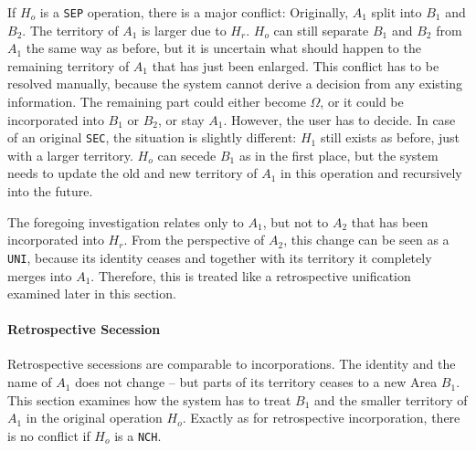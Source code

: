 If $H_o$ is a \texttt{SEP} operation, there is a major conflict: Originally, $A_1$ split into $B_1$ and $B_2$. The territory of $A_1$ is larger due to $H_r$. $H_o$ can still separate $B_1$ and $B_2$ from $A_1$ the same way as before, but it is uncertain what should happen to the remaining territory of $A_1$ that has just been enlarged. This conflict has to be resolved manually, because the system cannot derive a decision from any existing information. The remaining part could either become $\Omega$, or it could be incorporated into $B_1$ or $B_2$, or stay $A_1$. However, the user has to decide. In case of an original \texttt{SEC}, the situation is slightly different: $H_1$ still exists as before, just with a larger territory. $H_o$ can secede $B_1$ as in the first place, but the system needs to update the old and new territory of $A_1$ in this operation and recursively into the future.

The foregoing investigation relates only to $A_1$, but not to $A_2$ that has been incorporated into $H_r$. From the perspective of $A_2$, this change can be seen as a \texttt{UNI}, because its identity ceases and together with its territory it completely merges into $A_1$. Therefore, this is treated like a retrospective unification examined later in this section.


\paragraph{Retrospective Secession} %
\label{par:retrospective_secession}

Retrospective secessions are comparable to incorporations. The identity and the name of $A_1$ does not change -- but parts of its territory ceases to a new Area $B_1$. This section examines how the system has to treat $B_1$ and the smaller territory of $A_1$ in the original operation $H_o$. Exactly as for retrospective incorporation, there is no conflict if $H_o$ is a \texttt{NCH}.

